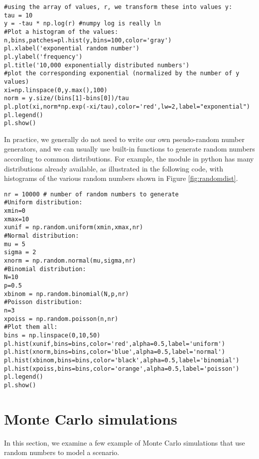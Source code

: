 \begin{lstlisting}[frame=single] 
#using the array of values, r, we transform these into values y:
tau = 10
y = -tau * np.log(r) #numpy log is really ln
#Plot a histogram of the values:
n,bins,patches=pl.hist(y,bins=100,color='gray')
pl.xlabel('exponential random number')
pl.ylabel('frequency')
pl.title('10,000 exponentially distributed numbers')
#plot the corresponding exponential (normalized by the number of y values)
xi=np.linspace(0,y.max(),100)
norm = y.size/(bins[1]-bins[0])/tau
pl.plot(xi,norm*np.exp(-xi/tau),color='red',lw=2,label="exponential")
pl.legend()
pl.show()
\end{lstlisting}

In practice, we generally do not need to write our own pseudo-random number generators, and we can usually use built-in functions to generate random numbers according to common distributions. For example, the  module in python has many distributions already available, as illustrated in the following code, with histograms of the various random numbers shown in Figure \ref{fig:randomdist}.
\begin{lstlisting}[frame=single] 
nr = 10000 # number of random numbers to generate
#Uniform distribution:
xmin=0
xmax=10
xunif = np.random.uniform(xmin,xmax,nr)
#Normal distribution:
mu = 5
sigma = 2
xnorm = np.random.normal(mu,sigma,nr)
#Binomial distribution:
N=10
p=0.5
xbinom = np.random.binomial(N,p,nr)
#Poisson distribution:
n=3
xpoiss = np.random.poisson(n,nr)
#Plot them all:
bins = np.linspace(0,10,50)
pl.hist(xunif,bins=bins,color='red',alpha=0.5,label='uniform')
pl.hist(xnorm,bins=bins,color='blue',alpha=0.5,label='normal')
pl.hist(xbinom,bins=bins,color='black',alpha=0.5,label='binomial')
pl.hist(xpoiss,bins=bins,color='orange',alpha=0.5,label='poisson')
pl.legend()
pl.show()
\end{lstlisting}

\section{Monte Carlo simulations}
In this section, we examine a few example of Monte Carlo simulations that use random numbers to model a scenario.
